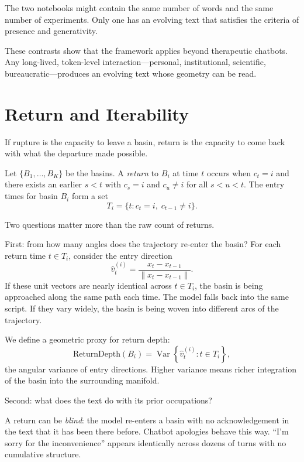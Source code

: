 The two notebooks might contain the same number of words and the same number of experiments. Only one has an evolving text that satisfies the criteria of presence and generativity.

These contrasts show that the framework applies beyond therapeutic chatbots. Any long-lived, token-level interaction---personal, institutional, scientific, bureaucratic---produces an evolving text whose geometry can be read.

\section{Return and Iterability}

If rupture is the capacity to leave a basin, return is the capacity to come back with what the departure made possible.

Let $\{B_1, \ldots, B_K\}$ be the basins. A \emph{return} to $B_i$ at time $t$ occurs when $c_t = i$ and there exists an earlier $s < t$ with $c_s = i$ and $c_u \neq i$ for all $s < u < t$. The entry times for basin $B_i$ form a set
\[
T_i = \{ t : c_t = i,\; c_{t-1} \neq i \}.
\]

Two questions matter more than the raw count of returns.

First: from how many angles does the trajectory re-enter the basin? For each return time $t \in T_i$, consider the entry direction
\[
\hat{v}_t^{(i)} = \frac{x_t - x_{t-1}}{\|x_t - x_{t-1}\|}.
\]
If these unit vectors are nearly identical across $t \in T_i$, the basin is being approached along the same path each time. The model falls back into the same script. If they vary widely, the basin is being woven into different arcs of the trajectory.

We define a geometric proxy for return depth:
\begin{equation}
\text{ReturnDepth}(B_i) = \operatorname{Var}\left\{\hat{v}^{(i)}_t : t \in T_i\right\},
\end{equation}
the angular variance of entry directions. Higher variance means richer integration of the basin into the surrounding manifold.

Second: what does the text do with its prior occupations?

A return can be \emph{blind}: the model re-enters a basin with no acknowledgement in the text that it has been there before. Chatbot apologies behave this way. ``I'm sorry for the inconvenience'' appears identically across dozens of turns with no cumulative structure.

